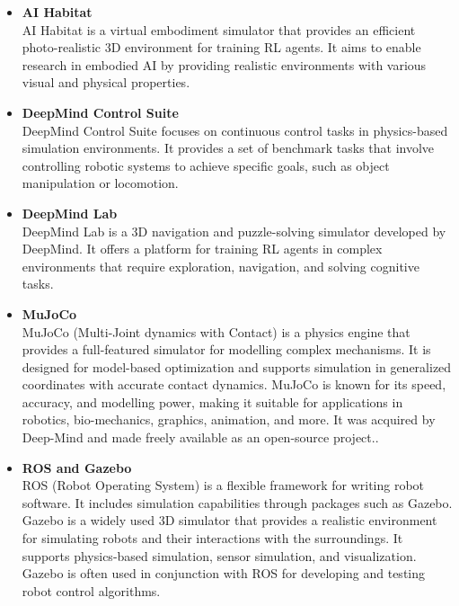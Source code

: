 \begin{itemize}

\item {\bf AI Habitat}\\
AI Habitat is a virtual embodiment simulator that provides an efficient photo-realistic 3D environment for training RL agents. It aims to enable research in embodied AI by providing realistic environments with various visual and physical properties.\cite{habitat2019}\cite{habitat2021}\cite{aihabitat}

\item {\bf DeepMind Control Suite}\\
DeepMind Control Suite focuses on continuous control tasks in physics-based simulation environments. It provides a set of benchmark tasks that involve controlling robotic systems to achieve specific goals, such as object manipulation or locomotion.\cite{deepmindcontrolsuite2018}

\item {\bf DeepMind Lab}\\
DeepMind Lab is a 3D navigation and puzzle-solving simulator developed by DeepMind. It offers a platform for training RL agents in complex environments that require exploration, navigation, and solving cognitive tasks.\cite{deeplab2016}

\item {\bf MuJoCo}\\
MuJoCo (Multi-Joint dynamics with Contact) is a physics engine that provides a full-featured simulator for modelling complex mechanisms. It is designed for model-based optimization and supports simulation in generalized coordinates with accurate contact dynamics. MuJoCo is known for its speed, accuracy, and modelling  power, making it suitable for applications in robotics, bio-mechanics, graphics, animation, and more. It was acquired by Deep-Mind and made freely available as an open-source project.\cite{mujoco}.


\item {\bf ROS and Gazebo}\\
ROS (Robot Operating System) is a flexible framework for writing robot software. It includes simulation capabilities through packages such as Gazebo. Gazebo is a widely used 3D simulator that provides a realistic environment for simulating robots and their interactions with the surroundings. It supports physics-based simulation, sensor simulation, and visualization. Gazebo is often used in conjunction with ROS for developing and testing robot control algorithms.\cite{ros}\cite{gazebosim}


\end{itemize}
